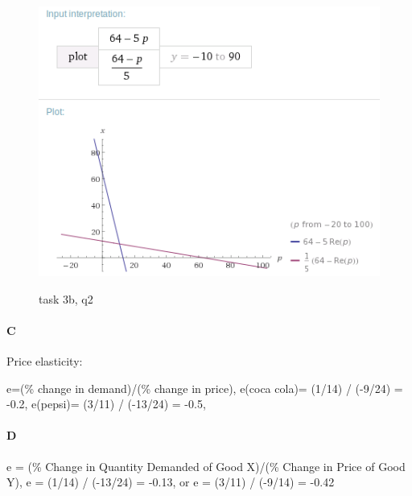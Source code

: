 \documentclass[12pt, a4paper]{article}
\begin{document}
\begin{figure}[htb]
    \centering
    \includegraphics[width=\textwidth]{q2}
    \label{q2}
    \caption{}
task 3b, q2
\end{figure}

\paragraph{C}
Price elasticity: 

e=(\% change in demand)/(\% change in price),
e(coca cola)= (1/14) / (-9/24) = -0.2,
e(pepsi)= (3/11) / (-13/24) = -0.5,

\paragraph{D}
e = (\% Change in Quantity Demanded of Good X)/(\% Change in Price of Good Y), 
e = (1/14) / (-13/24) = -0.13, or e = (3/11) / (-9/14) = -0.42
\end{document}
